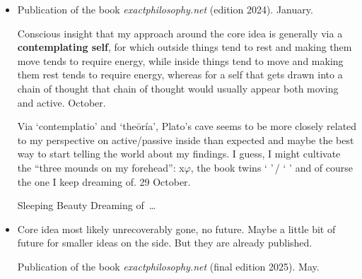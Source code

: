 \small
\begin{itemize}

\newpage

\vspace*{164mm}

\item[2024]
Publication of the book \textsl{exactphilosophy.net} (edition 2024).
%
January.

Conscious insight that my approach around the core idea
is generally via a \textbf{\color{xphi}contemplating self},
for which outside things tend to rest and making them move tends to require energy,
while inside things tend to move and making them rest tends to require energy,
whereas for a self that gets drawn into a chain of thought
that chain of thought would usually appear both moving and active.
%
October.

Via ‘contemplatio’ and ‘theōría’,
Plato’s cave seems to be more closely related
to my perspective on active/passive inside
than expected
and maybe the best way to start telling the world about my findings.
%
I guess,
I might cultivate the “three mounds on my forehead”:
x$\varphi$,
the book twins ‘  ’\,/ ‘  ’
and of course the one I keep dreaming of.
%
29 October.

Sleeping Beauty Dreaming of \ELEMENTAL\,…

\item[2025]
{\color{darkgray}%
Core idea most likely unrecoverably gone, no future.
%
Maybe a little bit of future for smaller ideas on the side.
%
But they are already published.}

Publication of the book \textsl{exactphilosophy.net} (final edition 2025).
%
May.

\newpage


\end{itemize}
